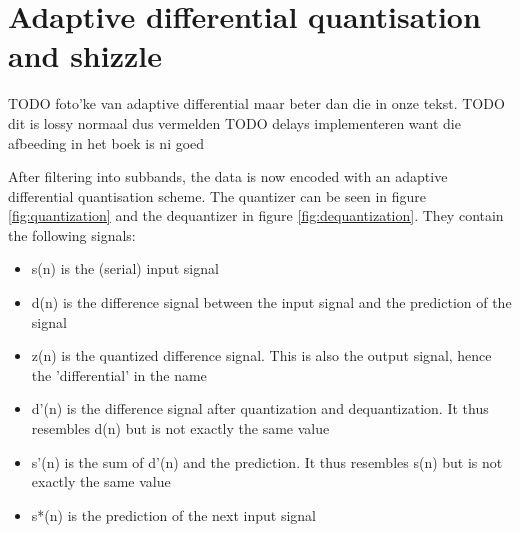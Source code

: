 \documentclass[a4paper]{article}
\begin{document}
\section{Adaptive differential quantisation and shizzle}
TODO foto'ke van adaptive differential maar beter dan die in onze tekst.
TODO dit is lossy normaal dus vermelden
TODO delays implementeren want die afbeeding in het boek is ni goed 

After filtering into subbands, the data is now encoded with an adaptive differential quantisation scheme. The quantizer can be seen in figure \ref{fig:quantization} and the dequantizer in figure \ref{fig:dequantization}. They contain the following signals:

\begin{itemize}
\item s(n) is the (serial) input signal
\item d(n) is the difference signal between the input signal and the prediction of the signal
\item z(n) is the quantized difference signal. This is also the output signal, hence the 'differential' in the name
\item d'(n) is the difference signal after quantization and dequantization. It thus resembles d(n) but is not exactly the same value
\item s'(n) is the sum of d'(n) and the prediction. It thus resembles s(n) but is not exactly the same value
\item s*(n) is the prediction of the next input signal 
\end{itemize}
\end{document}
